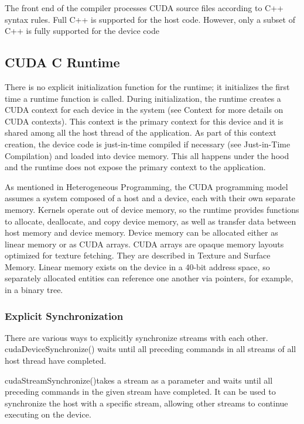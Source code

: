 The front end of the compiler processes CUDA source files according to C++ 
syntax rules. Full C++ is supported for the host code. However, only a subset 
of C++ is fully supported for the device code~\cite[p.~3.1.5]{CUDA18}
%
\subsection{CUDA C Runtime}%
There is no explicit initialization function for the runtime; it initializes 
the first time a runtime function is called. During initialization, the runtime 
creates a CUDA context for each device in the system (see Context for more 
details on CUDA contexts). This context is the primary context for this device 
and it is shared among all the host thread of the application. As 
part of this context creation, the device code is just-in-time compiled if 
necessary (see Just-in-Time Compilation) and loaded into device memory. This 
all happens under the hood and the runtime does not expose the primary context 
to the application.~\cite[p.~3.2.1]{CUDA18}

As mentioned in Heterogeneous Programming, the CUDA programming model assumes a 
system composed of a host and a device, each with their own separate memory. 
Kernels operate out of device memory, so the runtime provides functions to 
allocate, deallocate, and copy device memory, as well as transfer data between 
host memory and device memory. Device memory can be allocated either as linear 
memory or as CUDA arrays. CUDA arrays are opaque memory layouts optimized for 
texture fetching. They are described in Texture and Surface Memory. Linear 
memory exists on the device in a 40-bit address space, so separately allocated 
entities can reference one another via pointers, for example, in a binary 
tree.~\cite[p.~3.2.2]{CUDA18}
%
\subsubsection{Explicit Synchronization}%
There are various ways to explicitly synchronize streams with each other.
cudaDeviceSynchronize() waits until all preceding commands in all streams of 
all host thread have completed.

cudaStreamSynchronize()takes a stream as a parameter and waits until all 
preceding commands in the given stream have completed. It can be used to 
synchronize the host with a specific stream, allowing other streams to 
continue executing on the device.

